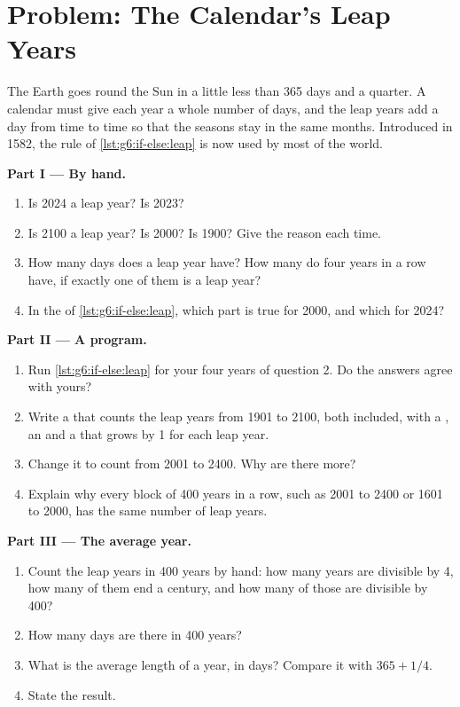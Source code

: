 \section{Problem: The Calendar's Leap Years}

\begin{problem}\label{pb:g6:if-else:1}
The Earth goes round the Sun in a little less than 365 days and a quarter. A
calendar must give each year a whole number of days, and the leap years add a
day from time to time so that the seasons stay in the same months. Introduced in
1582, the rule of \cref{lst:g6:if-else:leap} is now used by most of the world.

\medskip\noindent\textbf{Part I --- By hand.}
\begin{enumerate}
  \item Is 2024 a leap year? Is 2023?
  \item Is 2100 a leap year? Is 2000? Is 1900? Give the reason each time.
  \item How many days does a leap year have? How many do four years in a row
    have, if exactly one of them is a leap year?
  \item In the  of \cref{lst:g6:if-else:leap}, which part is true
    for 2000, and which for 2024?
\end{enumerate}

\medskip\noindent\textbf{Part II --- A program.}
\begin{enumerate}[resume]
  \item Run \cref{lst:g6:if-else:leap} for your four years of question 2. Do
    the answers agree with yours?
  \item Write a  that counts the leap years from 1901 to 2100, both
    included, with a  , an  and a 
     that grows by 1 for each leap year.
  \item Change it to count from 2001 to 2400. Why are there more?
  \item Explain why every block of 400 years in a row, such as 2001 to 2400 or
    1601 to 2000, has the same number of leap years.
\end{enumerate}

\medskip\noindent\textbf{Part III --- The average year.}
\begin{enumerate}[resume]
  \item Count the leap years in 400 years by hand: how many years are
    divisible by 4, how many of them end a century, and how many of those are
    divisible by 400?
  \item How many days are there in 400 years?
  \item What is the average length of a year, in days? Compare it with $365
    + 1/4$.
  \item State the result.
\end{enumerate}
\end{problem}
